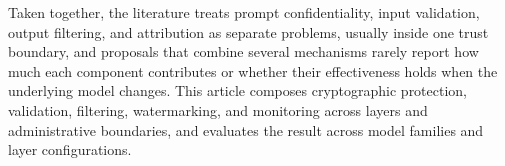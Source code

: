 Taken together, the literature treats prompt confidentiality, input validation, output filtering, and attribution as separate problems, usually inside one trust boundary, and proposals that combine several mechanisms rarely report how much each component contributes or whether their effectiveness holds when the underlying model changes. This article composes cryptographic protection, validation, filtering, watermarking, and monitoring across layers and administrative boundaries, and evaluates the result across model families and layer configurations.
